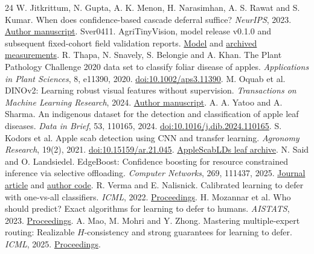 \documentclass[11pt]{article}
\begin{document}
\begin{thebibliography}{24}\setlength{\itemsep}{1.5pt}\setlength{\parskip}{0pt}
 W. Jitkrittum, N. Gupta, A. K. Menon, H. Narasimhan, A. S. Rawat and S. Kumar. When does confidence-based cascade deferral suffice? \emph{NeurIPS}, 2023. \href{https://arxiv.org/abs/2307.02764}{Author manuscript}.
 Sver0411. AgriTinyVision, model release v0.1.0 and subsequent fixed-cohort field validation reports. \href{https://github.com/Sver0411/AgriTinyVision/releases/tag/v0.1.0}{Model} and \href{https://github.com/Sver0411/AgriTinyVision/tree/16e7a2fdec43c02258f22e85b085ac269345e124/reports/field_validation}{archived measurements}.
 R. Thapa, N. Snavely, S. Belongie and A. Khan. The Plant Pathology Challenge 2020 data set to classify foliar disease of apples. \emph{Applications in Plant Sciences}, 8, e11390, 2020. \href{https://doi.org/10.1002/aps3.11390}{doi:10.1002/aps3.11390}.
 M. Oquab et al. DINOv2: Learning robust visual features without supervision. \emph{Transactions on Machine Learning Research}, 2024. \href{https://arxiv.org/abs/2304.07193}{Author manuscript}.
 A. A. Yatoo and A. Sharma. An indigenous dataset for the detection and classification of apple leaf diseases. \emph{Data in Brief}, 53, 110165, 2024. \href{https://doi.org/10.1016/j.dib.2024.110165}{doi:10.1016/j.dib.2024.110165}.
 S. Kodors et al. Apple scab detection using CNN and transfer learning. \emph{Agronomy Research}, 19(2), 2021. \href{https://doi.org/10.15159/ar.21.045}{doi:10.15159/ar.21.045}. \href{https://www.kaggle.com/datasets/projectlzp201910094/applescablds}{AppleScabLDs leaf archive}.
 N. Said and O. Landsiedel. EdgeBoost: Confidence boosting for resource constrained inference via selective offloading. \emph{Computer Networks}, 269, 111437, 2025. \href{https://doi.org/10.1016/j.comnet.2025.111437}{Journal article} and \href{https://github.com/ds-kiel/EdgeBoost/tree/26abd91857989a542ef67c7fd59f619ee563f458}{author code}.
 R. Verma and E. Nalisnick. Calibrated learning to defer with one-vs-all classifiers. \emph{ICML}, 2022. \href{https://proceedings.mlr.press/v162/verma22c.html}{Proceedings}.
 H. Mozannar et al. Who should predict? Exact algorithms for learning to defer to humans. \emph{AISTATS}, 2023. \href{https://proceedings.mlr.press/v206/mozannar23a.html}{Proceedings}.
 A. Mao, M. Mohri and Y. Zhong. Mastering multiple-expert routing: Realizable $H$-consistency and strong guarantees for learning to defer. \emph{ICML}, 2025. \href{https://proceedings.mlr.press/v267/mao25c.html}{Proceedings}.

\end{thebibliography}
\end{document}
